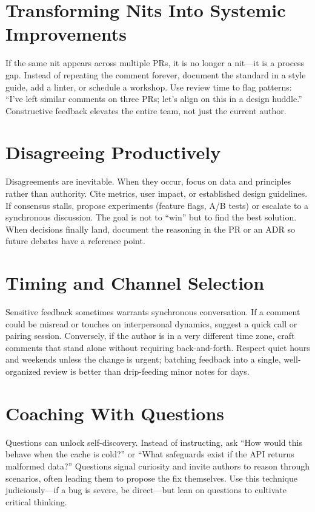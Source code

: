 \section{Transforming Nits Into Systemic Improvements}
If the same nit appears across multiple PRs, it is no longer a nit---it is a process gap. Instead of repeating the comment forever, document the standard in a style guide, add a linter, or schedule a workshop. Use review time to flag patterns: ``I've left similar comments on three PRs; let's align on this in a design huddle.'' Constructive feedback elevates the entire team, not just the current author.

\section{Disagreeing Productively}
Disagreements are inevitable. When they occur, focus on data and principles rather than authority. Cite metrics, user impact, or established design guidelines. If consensus stalls, propose experiments (feature flags, A/B tests) or escalate to a synchronous discussion. The goal is not to ``win'' but to find the best solution. When decisions finally land, document the reasoning in the PR or an ADR so future debates have a reference point.

\section{Timing and Channel Selection}
Sensitive feedback sometimes warrants synchronous conversation. If a comment could be misread or touches on interpersonal dynamics, suggest a quick call or pairing session. Conversely, if the author is in a very different time zone, craft comments that stand alone without requiring back-and-forth. Respect quiet hours and weekends unless the change is urgent; batching feedback into a single, well-organized review is better than drip-feeding minor notes for days.

\section{Coaching With Questions}
Questions can unlock self-discovery. Instead of instructing, ask ``How would this behave when the cache is cold?'' or ``What safeguards exist if the API returns malformed data?'' Questions signal curiosity and invite authors to reason through scenarios, often leading them to propose the fix themselves. Use this technique judiciously---if a bug is severe, be direct---but lean on questions to cultivate critical thinking.

